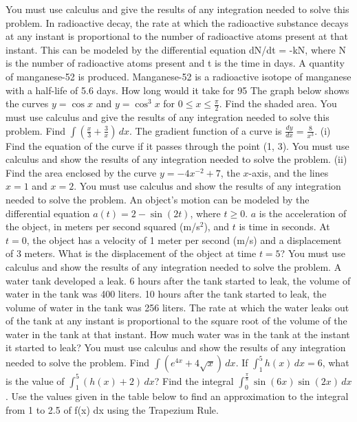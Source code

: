 \documentclass[12pt,addpoints]{exam}
\begin{document}
\begin{questions}
You must use calculus and give the results of any integration needed to solve this problem.
\fillwithlines{3cm}
\question[5] In radioactive decay, the rate at which the radioactive substance decays at any instant is proportional to the number of radioactive atoms present at that instant. This can be modeled by the differential equation dN/dt = -kN, where N is the number of radioactive atoms present and t is the time in days. A quantity of manganese-52 is produced. Manganese-52 is a radioactive isotope of manganese with a half-life of 5.6 days. How long would it take for 95%
\fillwithlines{3cm}
\question[5] The graph below shows the curves \( y = \cos x \) and \( y = \cos^3 x \) for \( 0 \leq x \leq \frac{\pi}{2} \). Find the shaded area. You must use calculus and give the results of any integration needed to solve this problem.
\fillwithlines{3cm}
\question[5] Find \(\int \left( \frac{x}{3} + \frac{3}{x} \right) \, dx\).
\fillwithlines{3cm}
\question[5] The gradient function of a curve is \( \frac{dy}{dx} = \frac{8}{x^3} \). (i) Find the equation of the curve if it passes through the point (1, 3). You must use calculus and show the results of any integration needed to solve the problem.
\fillwithlines{3cm}
\question[5] (ii) Find the area enclosed by the curve \( y = -4x^{-2} + 7 \), the \(x\)-axis, and the lines \(x = 1\) and \(x = 2\). You must use calculus and show the results of any integration needed to solve the problem.
\fillwithlines{3cm}
\question[5] An object's motion can be modeled by the differential equation \( a(t) = 2 - \sin(2t) \), where \( t \geq 0 \). \( a \) is the acceleration of the object, in meters per second squared (m/s\(^2\)), and \( t \) is time in seconds. At \( t = 0 \), the object has a velocity of 1 meter per second (m/s) and a displacement of 3 meters. What is the displacement of the object at time \( t = 5 \)? You must use calculus and show the results of any integration needed to solve the problem.
\fillwithlines{3cm}
\question[5] A water tank developed a leak. 6 hours after the tank started to leak, the volume of water in the tank was 400 liters. 10 hours after the tank started to leak, the volume of water in the tank was 256 liters. The rate at which the water leaks out of the tank at any instant is proportional to the square root of the volume of the water in the tank at that instant. How much water was in the tank at the instant it started to leak? You must use calculus and show the results of any integration needed to solve the problem.
\fillwithlines{3cm}
\question[5] Find \(\int (e^{4x} + 4\sqrt{x}) \, dx\).
\fillwithlines{3cm}
\question[5] If \(\int_1^5 h(x) \, dx = 6\), what is the value of \(\int_1^5 (h(x) + 2) \, dx\)?
\fillwithlines{3cm}
\question[5] Find the integral \(\int_0^{\frac{\pi}{8}} \sin(6x) \sin(2x) \, dx\).
\fillwithlines{3cm}
\question[5] Use the values given in the table below to find an approximation to the integral from 1 to 2.5 of f(x) dx using the Trapezium Rule.


\end{questions}
\end{document}
